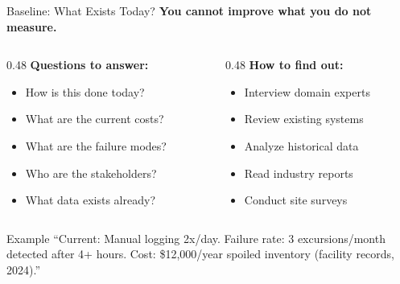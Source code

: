 \documentclass[aspectratio=169,11pt]{beamer}
\begin{document}
\begin{frame}{Baseline: What Exists Today?}
    \textbf{You cannot improve what you do not measure.}
    
    \vspace{0.3cm}
    \begin{columns}[T]
        \begin{column}{0.48\textwidth}
            \textbf{Questions to answer:}
            \begin{itemize}
                \item How is this done today?
                \item What are the current costs?
                \item What are the failure modes?
                \item Who are the stakeholders?
                \item What data exists already?
            \end{itemize}
        \end{column}
        \begin{column}{0.48\textwidth}
            \textbf{How to find out:}
            \begin{itemize}
                \item Interview domain experts
                \item Review existing systems
                \item Analyze historical data
                \item Read industry reports
                \item Conduct site surveys
            \end{itemize}
        \end{column}
    \end{columns}
    
    \vspace{0.3cm}
    \begin{block}{Example}
        ``Current: Manual logging 2x/day. Failure rate: 3 excursions/month detected after 4+ hours. Cost: \$12,000/year spoiled inventory (facility records, 2024).''
    \end{block}
\end{frame}
\end{document}
